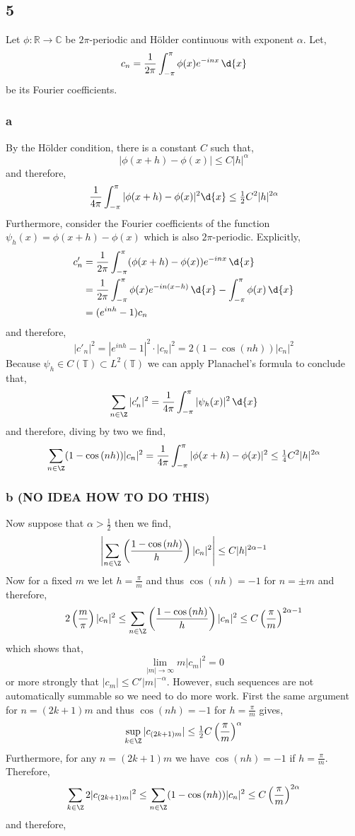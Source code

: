 \documentclass[12pt]{article}
\newcommand{\R}{\mathbb{R}}
\renewcommand{\C}{\mathbb{C}}
\renewcommand{\T}{\mathbb{T}}
\begin{document}
\subsection{5}

Let $\phi : \R \to \C$ be $2\pi$-periodic and H\"{o}lder continuous with exponent $\alpha$. Let,
\[ c_n = \frac{1}{2 \pi} \int_{-\pi}^\pi \phi(x) e^{-inx} \, \d{x} \]
be its Fourier coefficients.

\subsubsection{a}

By the H\"{o}lder condition, there is a constant $C$ such that,
\[ |\phi(x + h) - \phi(x)| \le C | h |^\alpha \]
and therefore,
\[ \frac{1}{4 \pi} \int_{-\pi}^\pi | \phi(x + h) - \phi(x) |^2 \d{x} \le \tfrac{1}{2} C^2 | h |^{2 \alpha} \]
Furthermore, consider the Fourier coefficients of the function $\psi_h(x) = \phi(x + h) - \phi(x)$ which is also $2\pi$-periodic. Explicitly,
\begin{align*}
c'_n & = \frac{1}{2 \pi} \int^{\pi}_{-\pi} (\phi(x + h) - \phi(x)) e^{-inx} \, \d{x}
\\
& = \frac{1}{2 \pi} \int_{-\pi}^{\pi} \phi(x) e^{-in(x - h)} \, \d{x} - \int_{-\pi}^{\pi} \phi(x) \, \d{x} 
\\
& = (e^{i n h} - 1) c_n  
\end{align*}
and therefore,
\[ |c'_n|^2 = |e^{i n h} - 1|^2 \cdot |c_n|^2 = 2 (1 - \cos{(nh)}) | c_n |^2 \]
Because $\psi_h \in C(\T) \subset L^2(\T)$ we can apply Planachel's formula to conclude that,
\[ \sum_{n \in \Z} |c_n'|^2 = \frac{1}{4 \pi} \int_{-\pi}^{\pi} | \psi_h(x)|^2 \, \d{x} \]
and therefore, diving by two we find,
\[ \sum_{n \in \Z} (1 - \cos{(n h)}) |c_n|^2 = \frac{1}{4 \pi} \int_{-\pi}^\pi | \phi(x + h) - \phi(x) |^2 \le \tfrac{1}{4} C^2 | h |^{2 \alpha} \]

\subsubsection{b (NO IDEA HOW TO DO THIS)}

Now suppose that $\alpha > \tfrac{1}{2}$ then we find,
\[ \left| \sum_{n \in \Z} \left( \frac{1 - \cos{(n h)}}{h} \right) |c_n|^2 \right| \le C |h|^{2 \alpha - 1} \]
Now for a fixed $m$ we let $h = \frac{\pi}{m}$ and thus $\cos{(nh)} = - 1$ for $n = \pm m$ and therefore,
\[ 2 \left( \frac{m}{\pi} \right) |c_n|^2 \le \sum_{n \in \Z} \left( \frac{1 - \cos{(nh)}}{h} \right) |c_n|^2 \le C \left( \frac{\pi}{m} \right)^{2 \alpha-1} \]
which shows that,
\[ \lim_{|m| \to \infty} m |c_m|^2 = 0 \]
or more strongly that $|c_m| \le C' |m|^{-\alpha}$. However, such sequences are not automatically summable so we need to do more work. First the same argument for $n = (2 k + 1) m$ and thus $\cos{(nh)} = -1$ for $h = \frac{\pi}{m}$ gives,
\[ \sup_{k \in \Z} | c_{(2 k + 1)m}| \le \tfrac{1}{2} C \left( \frac{\pi}{m} \right)^\alpha \]
Furthermore, for any $n = (2 k + 1) m$ we have $\cos{(nh)} = -1$ if $h = \frac{\pi}{m}$. Therefore,
\[ \sum_{k \in \Z} 2 | c_{(2 k + 1)m}|^2 \le \sum_{n \in \Z} (1 - \cos{(nh)}) |c_n|^2 \le C \left( \frac{\pi}{m} \right)^{2 \alpha} \]
and therefore,
\end{document}

